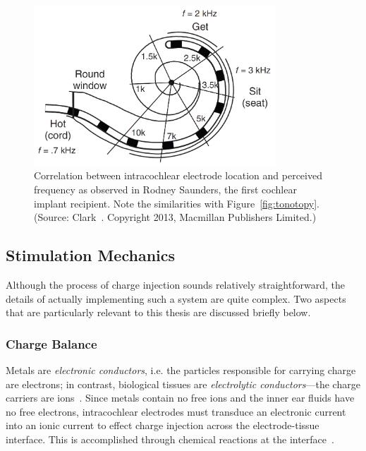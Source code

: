 \begin{figure}
	\centering
	\includegraphics[height=6cm]{Background/pitch_place}
	\caption[Correlation between electrode location and perceived
	frequency]{Correlation between intracochlear electrode location and perceived
	frequency as observed in Rodney Saunders, the first cochlear implant recipient.
	Note the similarities with Figure~\ref{fig:tonotopy}. (Source:
	Clark~\cite{clark2013}. Copyright \textcopyright{} 2013, Macmillan Publishers
	Limited.)}
	\label{fig:pitch_place}
\end{figure}

\subsection{Stimulation Mechanics}

Although the process of charge injection sounds relatively straightforward, the
details of actually implementing such a system are quite complex. Two aspects
that are particularly relevant to this thesis are discussed briefly below.

\subsubsection{Charge Balance}
\label{sect:charge_balance}

Metals are \emph{electronic conductors}, i.e. the particles responsible for
carrying charge are electrons; in contrast, biological tissues are
\emph{electrolytic conductors}---the charge carriers are
ions~\cite{webster1998,grimnes2000}. Since metals contain no free ions and the
inner ear fluids have no free electrons, intracochlear electrodes must transduce
an electronic current into an ionic current to effect charge injection across
the electrode-tissue interface. This is accomplished through chemical reactions
at the interface~\cite{webster1998}.

